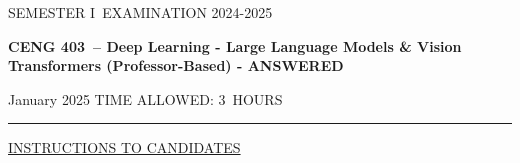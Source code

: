 \documentclass[12pt]{article}
\newcommand{\masunitnumber}{CENG 403}
\newcommand{\examdate}{January 2025}
\newcommand{\academicyear}{2024-2025}
\newcommand{\semester}{I}
\newcommand{\coursename}{Deep Learning - Large Language Models \& Vision Transformers (Professor-Based) - ANSWERED}
\newcommand{\numberofhours}{3}
\begin{document}
\setlength{\headsep}{5truemm}
\setlength{\headheight}{14.5truemm}
\setlength{\voffset}{-0.45truein}
\renewcommand{\headrulewidth}{0.0pt}
\begin{center}
SEMESTER \semester\ EXAMINATION \academicyear
\end{center}
\begin{center}
{\bf \masunitnumber\ -- \coursename}
\end{center}
\vspace{20truemm}
\noindent \examdate\hspace{45truemm} TIME ALLOWED: \numberofhours\ HOURS
\vspace{19truemm}
\hrule
\vspace{19truemm}
\noindent\underline{INSTRUCTIONS TO CANDIDATES}
\vspace{8truemm}
\end{document}
